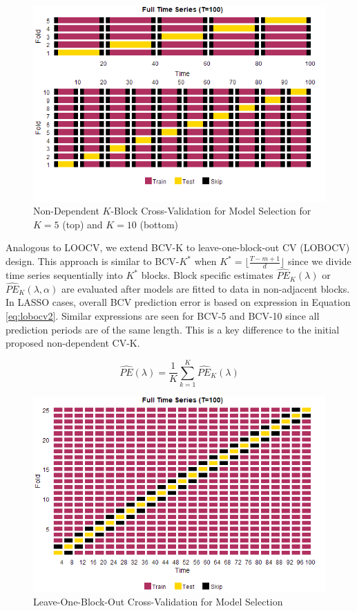 \begin{figure}[htbp!]
	\caption{Non-Dependent $K$-Block Cross-Validation for Model Selection for $K=5$ (top) and $K=10$ (bottom)}
	\label{fig:bcvplots}
	\includegraphics[scale=0.7]{bcvplots}
\end{figure}

Analogous to LOOCV, we extend BCV-K to leave-one-block-out CV (LOBOCV) design. This approach is similar to BCV-$K^*$ when $K^*=\lfloor \frac{T-m+1}{d} \rfloor$ since we divide time series sequentially into $K^*$ blocks. Block specific estimates $\widehat{PE}_K(\lambda)$ or $\widehat{PE}_K(\lambda,\alpha)$ are evaluated after models are fitted to data in non-adjacent blocks. In LASSO cases, overall BCV prediction error is based on expression in Equation \ref{eq:lobocv2}. Similar expressions are seen for BCV-5 and BCV-10 since all prediction periods are of the same length. This is a key difference to the initial proposed non-dependent CV-K.

\begin{equation}
\label{eq:lobocv2}
	\widehat{PE}(\lambda)=\frac{1}{K}\sum\limits_{k=1}^K \widehat{PE}_K(\lambda)
\end{equation}

\begin{figure}[htbp!]
	\caption{Leave-One-Block-Out Cross-Validation for Model Selection}
	\label{fig:lobocvplots}
	\includegraphics[scale=0.7]{lobocvplots}
\end{figure}

